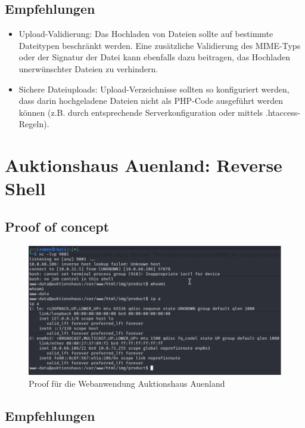 \subsection*{Empfehlungen}
\begin{itemize}
    \item Upload-Validierung: Das Hochladen von Dateien sollte auf bestimmte Dateitypen beschränkt werden. Eine zusätzliche Validierung des MIME-Typs oder der Signatur der Datei kann ebenfalls dazu beitragen, das Hochladen unerwünschter Dateien zu verhindern.
    \item Sichere Dateiuploads: Upload-Verzeichnisse sollten so konfiguriert werden, dass darin hochgeladene Dateien nicht als PHP-Code ausgeführt werden können (z.B. durch entsprechende Serverkonfiguration oder mittels .htaccess-Regeln).
\end{itemize}


\section{\makecvssbadge Auktionshaus Auenland: Reverse Shell}

\subsection*{Proof of concept}
\begin{figure}[!ht]
    \centering
    \includegraphics[width=\linewidth]{images/proofs/06_auktionshaus_proof.png}
    \caption{Proof für die Webanwendung Auktionshaus Auenland}
    \label{fig:06_auktionshaus_proof}
\end{figure}

\subsection*{Empfehlungen}